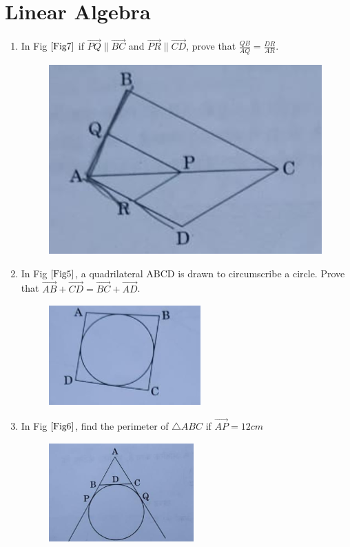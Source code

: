 \documentclass[journal,12pt,twocolumn]{IEEEtran}
\begin{document}
\section{Linear Algebra}
\begin{enumerate}
    \item In Fig $\ref{Fig7}$ if $\vec{PQ} \parallel \vec{BC}$ and $\vec{PR} \parallel \vec{CD}$, prove that $\frac{QB}{AQ} = \frac{DR}{AR}$.\\
    \begin{figure}[h!]
        \centering
        \includegraphics[width=0.5\columnwidth]{Fig7.png}
    	\caption{}
    	\label{Fig7}
     \end{figure}
    \item In Fig $\ref{Fig5}$, a quadrilateral ABCD is drawn to circumscribe a circle. Prove that $\vec{AB} + \vec{CD} = \vec{BC} + \vec{AD}$.\\
	    \solution 
    \begin{figure}[h!]
        \centering
        \includegraphics[width=0.5\columnwidth]{Fig5.png}
    	\caption{}
    	\label{Fig5}
     \end{figure}
     \item In Fig $\ref{Fig6}$, find the perimeter of $\triangle ABC$ if $\vec{AP} = 12cm$\\
    \begin{figure}[h!]
        \centering
        \includegraphics[width=0.5\columnwidth]{Fig6.png}

\end{figure}
\end{enumerate}
\end{document}

